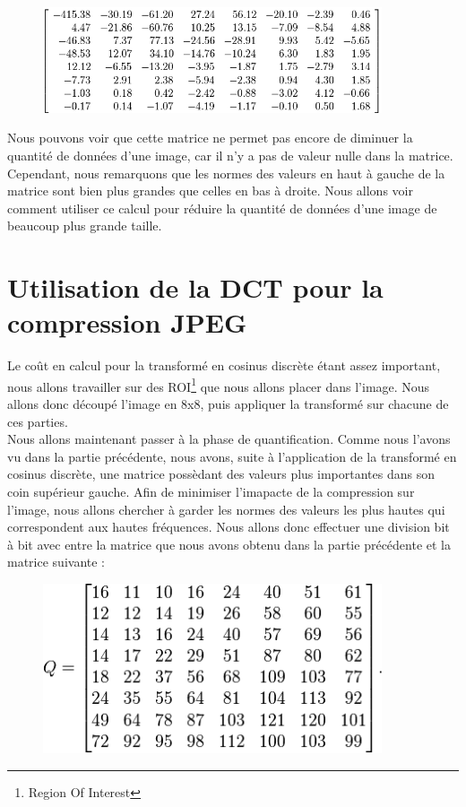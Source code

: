 \documentclass[a4paper,11pt]{article}
\begin{document}
  \begin{figure}[H]
    \center
   \includegraphics[width=10cm]{matrice_cosinus.png}
  \end{figure}

  Nous pouvons voir que cette matrice ne permet pas encore de diminuer la quantité de données d'une image, car il n'y a pas de valeur 
  nulle dans la matrice. Cependant, nous remarquons que les normes des valeurs en haut à gauche de la matrice sont bien plus grandes 
  que celles en bas à droite. Nous allons voir comment utiliser ce calcul pour réduire la quantité de données d'une image de beaucoup 
  plus grande taille.
  
  \section{Utilisation de la DCT pour la compression JPEG}
  Le coût en calcul pour la transformé en cosinus discrète étant assez important, nous allons travailler sur des ROI\footnote{Region Of Interest}
  que nous allons placer dans l'image. Nous allons donc découpé l'image en 8x8, puis appliquer la transformé sur chacune de ces parties.\\
  
  Nous allons maintenant passer à la phase de quantification. Comme nous l'avons vu dans la partie précédente, nous avons, suite à
  l'application de la transformé en cosinus discrète, une matrice possèdant des valeurs plus importantes dans son coin supérieur
  gauche. Afin de minimiser l'imapacte de la compression sur l'image, nous allons chercher à garder les normes des valeurs les plus 
  hautes qui correspondent aux hautes fréquences. %
  Nous allons donc effectuer une division bit à bit avec entre la matrice que nous avons obtenu dans la partie précédente 
  et la matrice suivante : 
  \begin{figure}[H]
    \center
   \includegraphics[width=10cm]{quantification.png}
  \end{figure}
\end{document}
